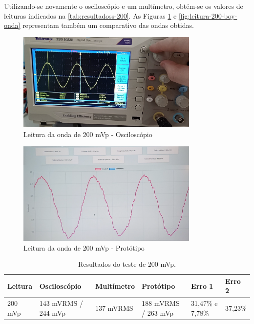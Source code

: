 Utilizando-se novamente o osciloscópio e um multímetro, obtém-se os valores de leituras indicados na \autoref{tab:resultadoss-200}. As Figuras \ref{fig:leitura-200-osc} e \autoref{fig:leitura-200-boy-onda} representam também um comparativo das ondas obtidas.

\begin{figure}[htb!]
    \caption{Leitura da onda de 200 mVp - Osciloscópio}
    \vspace*{5mm}
    \label{fig:leitura-200-osc}
    \includegraphics[width=0.8\textwidth]{figuras/leitura-200-osc.png}
    \fonte{}
\end{figure}

\begin{figure}[htb!]
    \caption{Leitura da onda de 200 mVp - Protótipo}
    \vspace*{5mm}
    \label{fig:leitura-200-boy-onda}
    \includegraphics[width=0.8\textwidth]{figuras/leitura-200-boy-onda.png}
    \fonte{}
\end{figure}

\begin{table}[!ht]
    \centering
    \caption{Resultados do teste de 200 mVp.}
    \vspace*{5mm}
    \label{tab:resultadoss-200}
    \begin{tabular}{ p{2cm} p{3cm} p{2cm} p{2cm} p{2cm} p{2cm} }
        \hline
        \textbf{Leitura} & \textbf{Osciloscópio} & \textbf{Multímetro} & \textbf{Protótipo}    & \textbf{Erro 1}  & \textbf{Erro 2}   \\ \hline
        200 mVp          & 143 mVRMS / 244 mVp   & 137 mVRMS           & 188 mVRMS / 263 mVp   & 31,47\% e 7,78\% & 37,23\%           \\ \hline
    \end{tabular}
    \fonte{}
\end{table}

